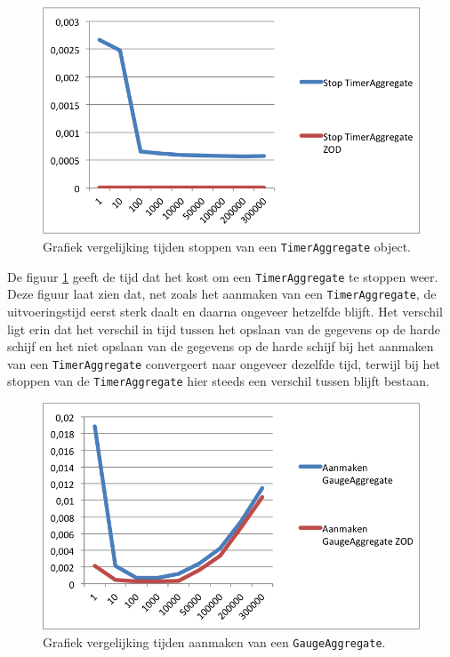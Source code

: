 \begin{figure}[h]
  \centering
  \includegraphics[scale=1.0]{Afbeeldingen/Evaluatie/StopTimerAggregate}
  \caption{Grafiek vergelijking tijden stoppen van een \texttt{TimerAggregate} object.}
  \label{fig:GraphTimerAggregateStop}
\end{figure}

De figuur \ref{fig:GraphTimerAggregateStop} geeft de tijd dat het kost om een \texttt{TimerAggregate} te stoppen weer. Deze figuur laat zien dat, net zoals het aanmaken van een \texttt{TimerAggregate}, de uitvoeringstijd eerst sterk daalt en daarna ongeveer hetzelfde blijft. Het verschil ligt erin dat het verschil in tijd tussen het opslaan van de gegevens op de harde schijf en het niet opslaan van de gegevens op de harde schijf bij het aanmaken van een \texttt{TimerAggregate} convergeert naar ongeveer dezelfde tijd, terwijl bij het stoppen van de \texttt{TimerAggregate} hier steeds een verschil tussen blijft bestaan. \\


\begin{figure}[h]
  \centering
  \includegraphics[scale=1.0]{Afbeeldingen/Evaluatie/AanmakenGaugeAggregate}
  \caption{Grafiek vergelijking tijden aanmaken van een \texttt{GaugeAggregate}.}
  \label{fig:GraphGaugeAggregate}
\end{figure}


